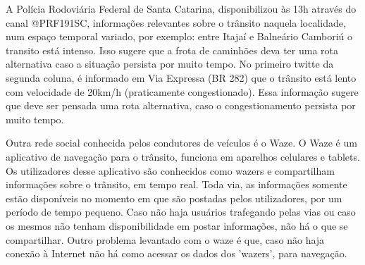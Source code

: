 \begin{figure}[ht]
\quad \quad \quad \quad
{}
\end{figure}

A Polícia Rodoviária Federal de Santa Catarina, disponibilizou às 13h através do canal @PRF191SC, informações relevantes sobre o trânsito naquela localidade, 
num espaço temporal variado, por exemplo: entre Itajaí e Balneário Camboriú o transito está intenso. Isso sugere que a frota de caminhões deva ter uma
rota alternativa caso a situação persista por muito tempo. No primeiro twitte da segunda coluna, é informado em Via Expressa (BR 282) que o trânsito está lento com 
velocidade de 20km/h (praticamente congestionado). Essa informação sugere que deve ser pensada uma rota alternativa, caso o congestionamento persista por muito tempo.

Outra rede social conhecida pelos condutores de veículos é o Waze. O Waze é um aplicativo de navegação para o trânsito, funciona em aparelhos celulares e tablets. 
Os utilizadores desse aplicativo são conhecidos como wazers e compartilham informações sobre o trânsito, em tempo real. Toda via, as informações somente estão disponíveis 
no momento em que são postadas pelos utilizadores, por um período de tempo pequeno. Caso não haja usuários trafegando pelas vias ou caso os mesmos não tenham disponibilidade 
em postar informações, não há o que se compartilhar.
Outro problema levantado com o waze é que, caso não haja conexão à Internet não há como acessar os dados dos 'wazers', para navegação.

